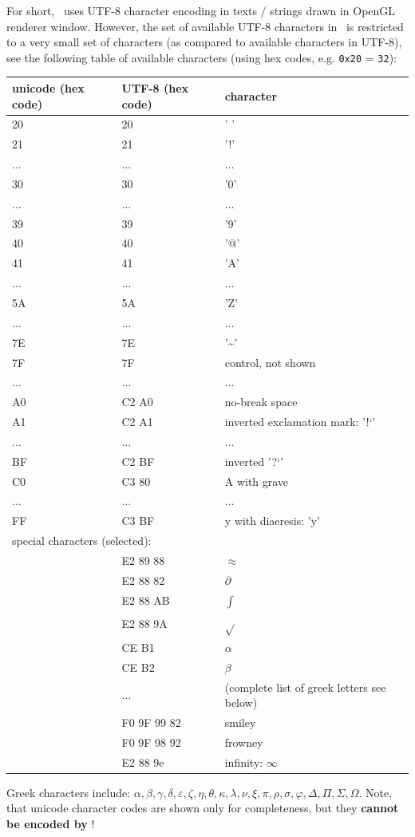 For short, \codeName\ uses UTF-8 character encoding in texts / strings drawn in OpenGL renderer window.
However, the set of available UTF-8 characters in \codeName\ is restricted to a very small set of characters (as compared to available characters in UTF-8), see the following table of available characters (using hex codes, e.g. \texttt{0x20} = \texttt{32}):
\begin{center}
  \footnotesize
  \begin{longtable}{| p{2cm} | p{4cm} | p{8cm} |} 
	\hline
  \bf unicode (hex code) & UTF-8 (hex code) & character \\ \hline
  20 & 20 & ' '\\
  21 & 21 & '!'\\
  $\ldots$ & $\ldots$ & $\ldots$\\
  30 & 30 & '0'\\
  $\ldots$ & $\ldots$ & $\ldots$\\
  39 & 39 & '9'\\
  40 & 40 & '@'\\
  41 & 41 & 'A'\\
  $\ldots$ & $\ldots$ & $\ldots$\\
  5A & 5A & 'Z'\\
  $\ldots$ & $\ldots$ & $\ldots$\\
  7E & 7E & '\textasciitilde{}'\\
  7F & 7F & control, not shown\\
  $\ldots$ & $\ldots$ & $\ldots$\\
  A0 & C2 A0 & no-break space\\
  A1 & C2 A1 & inverted exclamation mark: '!`'\\
  $\ldots$ & $\ldots$ & $\ldots$\\
  BF & C2 BF & inverted '?`'\\
  C0 & C3 80 & A with grave\\
  $\ldots$ & $\ldots$ & $\ldots$\\
  FF & C3 BF & y with diaeresis: '$\ddot{\mathrm{y}}$' \\ \hline
	\multicolumn{3}{l}{special characters (selected):} \\ \hline
	 & E2 89 88 & $\approx$ \\
	 & E2 88 82 & $\partial$ \\
	 & E2 88 AB & $\int{}$ \\
	 & E2 88 9A & $\sqrt{}$ \\
	 & CE B1 & $\alpha$ \\
	 & CE B2 & $\beta$ \\
	 & $\ldots$ & (complete list of greek letters see below) \\
   & F0 9F 99 82 & smiley \\
   & F0 9F 98 92 & frowney \\
	 & E2 88 9e & infinity: $\infty$ \\ \hline
	\hline
  \end{longtable}
\end{center}
Greek characters include: $\alpha, \beta, \gamma, \delta, \varepsilon, \zeta, \eta, \theta, 
\kappa, \lambda, \nu, \xi, \pi, \rho, \sigma, \varphi, \Delta, \Pi, \Sigma, \Omega$.
Note, that unicode character codes are shown only for completeness, but they {\bf cannot be encoded by \codeName}!



